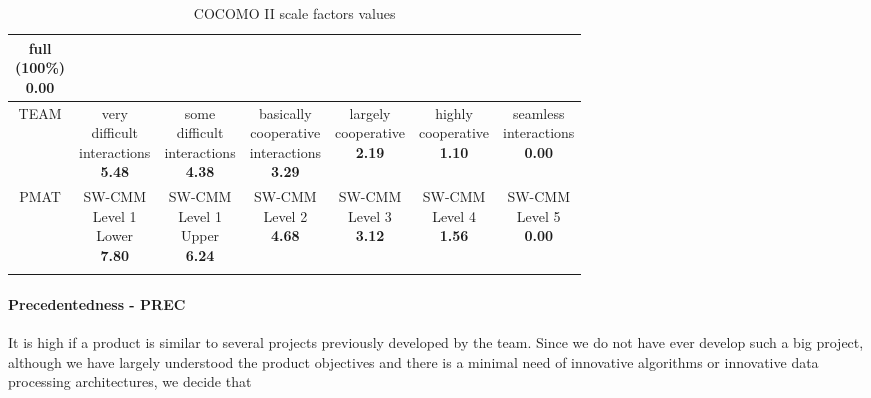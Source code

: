 {\begin{longtable}{c|cccccc}
\specialcell{full\\(100\%)\\\textbf{0.00}} \\
\midrule
TEAM &
\specialcell{very\\difficult\\interactions\\\textbf{5.48}} & 
\specialcell{some\\difficult\\interactions\\\textbf{4.38}} & 
\specialcell{basically\\cooperative\\interactions\\\textbf{3.29}} & 
\specialcell{largely\\cooperative\\\textbf{2.19}} & 
\specialcell{highly\\cooperative\\\textbf{1.10}} & 
\specialcell{seamless\\interactions\\\textbf{0.00}} \\
\midrule
PMAT &
\specialcell{SW-CMM\\Level 1\\Lower\\\textbf{7.80}} & 
\specialcell{SW-CMM\\Level 1\\Upper\\\textbf{6.24}} & 
\specialcell{SW-CMM\\Level 2\\\textbf{4.68}} & 
\specialcell{SW-CMM\\Level 3\\\textbf{3.12}} & 
\specialcell{SW-CMM\\Level 4\\\textbf{1.56}} & 
\specialcell{SW-CMM\\Level 5\\\textbf{0.00}} \\
\bottomrule
\caption{\label{tbl:cocomoSF}COCOMO II scale factors values}
\end{longtable}
}

\paragraph{Precedentedness - PREC} It is high if a product is similar to several projects previously developed by the team. Since we do not have ever develop such a big project, although we have largely understood the product objectives and there is a minimal need of innovative algorithms or innovative data processing architectures, we decide that

